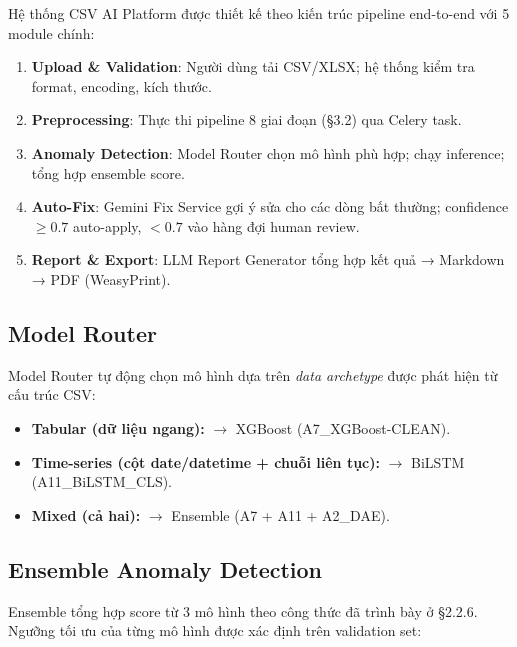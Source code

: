 Hệ thống CSV AI Platform được thiết kế theo kiến trúc pipeline end-to-end với 5 module chính:

\begin{enumerate}
  \item \textbf{Upload \& Validation}: Người dùng tải CSV/XLSX; hệ thống kiểm tra format, encoding, kích thước.
  \item \textbf{Preprocessing}: Thực thi pipeline 8 giai đoạn (§3.2) qua Celery task.
  \item \textbf{Anomaly Detection}: Model Router chọn mô hình phù hợp; chạy inference; tổng hợp ensemble score.
  \item \textbf{Auto-Fix}: Gemini Fix Service gợi ý sửa cho các dòng bất thường; confidence $\geq 0.7$ auto-apply, $< 0.7$ vào hàng đợi human review.
  \item \textbf{Report \& Export}: LLM Report Generator tổng hợp kết quả → Markdown → PDF (WeasyPrint).
\end{enumerate}

\subsection{Model Router}

Model Router tự động chọn mô hình dựa trên \textit{data archetype} được phát hiện từ cấu trúc CSV:

\begin{itemize}
  \item \textbf{Tabular (dữ liệu ngang):} $\rightarrow$ XGBoost (A7\_XGBoost-CLEAN).
  \item \textbf{Time-series (cột date/datetime + chuỗi liên tục):} $\rightarrow$ BiLSTM (A11\_BiLSTM\_CLS).
  \item \textbf{Mixed (cả hai):} $\rightarrow$ Ensemble (A7 + A11 + A2\_DAE).
\end{itemize}

\subsection{Ensemble Anomaly Detection}

Ensemble tổng hợp score từ 3 mô hình theo công thức đã trình bày ở §2.2.6. Ngưỡng tối ưu của từng mô hình được xác định trên validation set:

